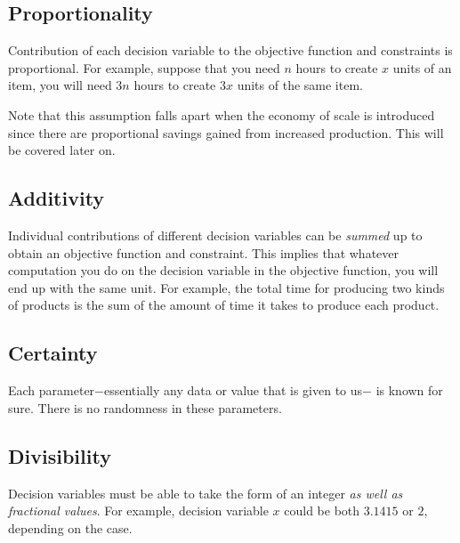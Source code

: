 \subsection*{Proportionality}

Contribution of each decision variable to the objective function and constraints is 
proportional. For example, suppose that you need $n$ hours to create $x$ units of
an item, you will need $3n$ hours to create $3x$ units of the same item.

Note that this assumption falls apart when the economy of scale is introduced since 
there are proportional savings gained from increased production. This will be covered 
later on.

\subsection*{Additivity}

Individual contributions of different decision variables can be \textit{summed} up to 
obtain an objective function and constraint. This implies that whatever computation
you do on the decision variable in the objective function, you will end up with the
same unit. For example, the total time for producing two kinds of products is the sum 
of the amount of time it takes to produce each product.

\subsection*{Certainty}

Each parameter$-$essentially any data or value that is given to us$-$ is known for sure.
There is no randomness in these parameters.

\subsection*{Divisibility}

Decision variables must be able to take the form of an integer \textit{as well as
fractional values}. For example, decision variable $x$ could be both $3.1415$ or $2$,
depending on the case.
